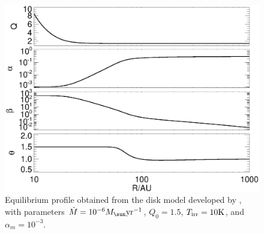 
\begin{figure}
  \includegraphics[width=\linewidth,clip=true,trim=0cm 0cm 0cm
    0.0cm]{figures/ppd_2d_basic}
  \caption{Equilibrium profile obtained from the disk model developed
    by \cite{rafikov15}, with parameters $\dot{M} =
    10^{-6}M_\sun\yr^{-1}$, $Q_0=1.5$, $T_\mathrm{irr}=10\mathrm{K}$, and
    $\alpha_m=10^{-3}$.   
    \label{rafikov_model}}
\end{figure}

